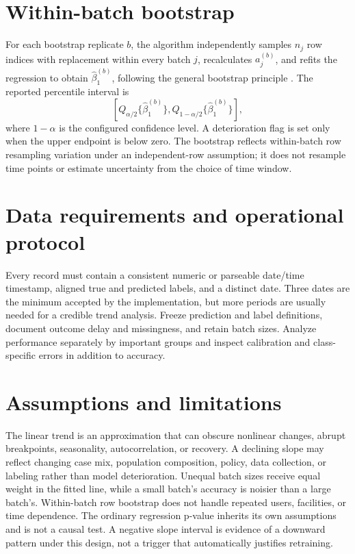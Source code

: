 \documentclass[conference]{IEEEtran}
\begin{document}
\section{Within-batch bootstrap}
For each bootstrap replicate \(b\), the algorithm independently samples \(n_j\) row indices with replacement within every batch \(j\), recalculates \(a_j^{(b)}\), and refits the regression to obtain \(\hat\beta_1^{(b)}\), following the general bootstrap principle \cite{efron1979}. The reported percentile interval is
\[
\left[Q_{\alpha/2}\{\hat\beta_1^{(b)}\},
Q_{1-\alpha/2}\{\hat\beta_1^{(b)}\}\right],
\]
where \(1-\alpha\) is the configured confidence level. A deterioration flag is set only when the upper endpoint is below zero. The bootstrap reflects within-batch row resampling variation under an independent-row assumption; it does not resample time points or estimate uncertainty from the choice of time window.

\section{Data requirements and operational protocol}
Every record must contain a consistent numeric or parseable date/time timestamp, aligned true and predicted labels, and a distinct date. Three dates are the minimum accepted by the implementation, but more periods are usually needed for a credible trend analysis. Freeze prediction and label definitions, document outcome delay and missingness, and retain batch sizes. Analyze performance separately by important groups and inspect calibration and class-specific errors in addition to accuracy.

\section{Assumptions and limitations}
The linear trend is an approximation that can obscure nonlinear changes, abrupt breakpoints, seasonality, autocorrelation, or recovery. A declining slope may reflect changing case mix, population composition, policy, data collection, or labeling rather than model deterioration. Unequal batch sizes receive equal weight in the fitted line, while a small batch's accuracy is noisier than a large batch's. Within-batch row bootstrap does not handle repeated users, facilities, or time dependence. The ordinary regression p-value inherits its own assumptions and is not a causal test. A negative slope interval is evidence of a downward pattern under this design, not a trigger that automatically justifies retraining.
\end{document}
